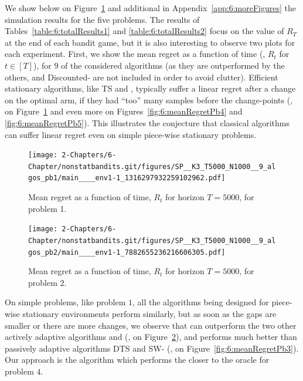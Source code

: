 We show below on Figure~\ref{fig:6:meanRegretPb1} and additional in Appendix~\ref{app:6:moreFigures} the simulation results for the five problems.
The results of Tables~\ref{table:6:totalResults1} and \ref{table:6:totalResults2} focus on the value of $R_T$ at the end of each bandit game, but it is also interesting to observe two plots for each experiment.
%
First, we show the mean regret as a function of time (\ie, $R_t$ for $t \in [T]$), for $9$ of the considered algorithms (as they are outperformed by the others, \ExpThreeS{} and Discounted-\klUCB{} are not included in order to avoid clutter).
%
Efficient stationary algorithms, like TS and \klUCB, typically suffer a linear regret after a change on the optimal arm, if they had ``too'' many samples before the change-points (\eg, on Figure~\ref{fig:6:meanRegretPb1} and even more on Figures~\ref{fig:6:meanRegretPb4} and \ref{fig:6:meanRegretPb5}).
This illustrates the conjecture that classical algorithms can suffer linear regret even on simple piece-wise stationary problems.


\begin{figure}[h!]  %
    \centering
    \texttt{[image: 2-Chapters/6-Chapter/nonstatbandits.git/figures/SP\_\_K3\_T5000\_N1000\_\_9\_algos\_pb1/main\_\_\_\_env1-1\_1316297932259102962.pdf]}
    \caption{Mean regret as a function of time, $R_t$ for horizon $T = 5000$, for problem 1.}
    \label{fig:6:meanRegretPb1}
\end{figure}

\begin{figure}[h!]  %
    \centering
    \texttt{[image: 2-Chapters/6-Chapter/nonstatbandits.git/figures/SP\_\_K3\_T5000\_N1000\_\_9\_algos\_pb2/main\_\_\_\_env1-1\_7882655236216606305.pdf]}
    \caption{Mean regret as a function of time, $R_t$ for horizon $T = 5000$, for problem $2$.}
    \label{fig:6:meanRegretPb2}
\end{figure}

On simple problems, like problem $1$, all the algorithms being designed for piece-wise stationary environments perform similarly, but as soon as the gaps are smaller or there are more changes, we observe that \GLRklUCB{} can outperform the two other actively adaptive algorithms \CUSUMklUCB{} and \MklUCB{} (\eg, on Figure~\ref{fig:6:meanRegretPb2}), and performs much better than passively adaptive algorithms DTS and SW-\klUCB{}  (\eg, on Figure~\ref{fig:6:meanRegretPb3}).
Our approach is the algorithm which performs the closer to the oracle for problem $4$.

